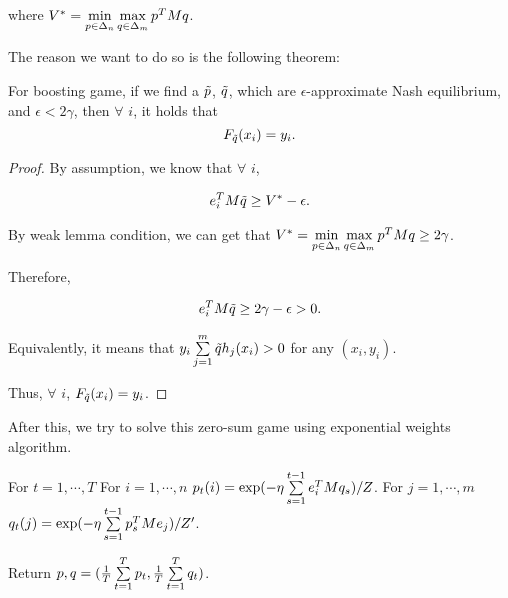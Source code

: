 \documentclass[main.tex]{subfiles}
\begin{document}
where $V^* = \min\limits_{p \in \Delta_n} \max\limits_{q \in \Delta_m} p^T M q$.

The reason we want to do so is the following theorem:

\begin{theorem}
For boosting game, if we find a $\tilde{p}$, $\tilde{q}$, which are $\epsilon$-approximate Nash equilibrium, and $\epsilon < 2 \gamma$, then $\forall$ $i$, it holds that 
\begin{equation}
F_{\tilde{q}} (x_i) = y_i.
\end{equation}
\end{theorem}

\begin{proof}
By assumption, we know that $\forall$ $i$, 

\begin{equation*}
	\begin{aligned}
		e_i^T M \tilde{q} \geq V^* -\epsilon. 
	\end{aligned}
\end{equation*}

By weak lemma condition, we can get that $V^* = \min\limits_{p \in \Delta_n} \max\limits_{q \in \Delta_m} p^T M q \geq 2\gamma$.

Therefore, 

\begin{equation*}
\begin{aligned}
e_i^T M \tilde{q} \geq 2\gamma -\epsilon > 0. 
\end{aligned}
\end{equation*}

Equivalently, it means that $y_i \sum\limits_{j=1}^m \tilde{q}  h_j(x_i) > 0 $ for any $(x_i, y_i)$. 

Thus, $\forall$ $i$, $F_{\tilde{q}} (x_i) = y_i$.
\end{proof}

After this, we try to solve this zero-sum game using exponential weights algorithm.

\begin{algorithm}[H]
	\begin{algorithmic}
		\STATE For $t = 1, \cdots ,T$
		\bindent
		\STATE For $i = 1, \cdots , n$
		\bindentt
			\STATE $p_t(i) = \exp(-\eta \sum\limits_{s=1}^{t-1} e_i^T Mq_s) / Z$.
		\eindentt
		\STATE For $j = 1, \cdots , m$
		\bindentt
			\STATE $q_t(j) = \exp(-\eta \sum\limits_{s=1}^{t-1} p_s^T M e_j) / Z'$.
		\eindentt
		
		Return $p, q = (\frac{1}{T} \sum\limits_{t = 1}^T p_t, \frac{1}{T} \sum\limits_{t = 1}^T q_t) $. 
		\eindent
	\end{algorithmic}
\end{algorithm}
\end{document}
